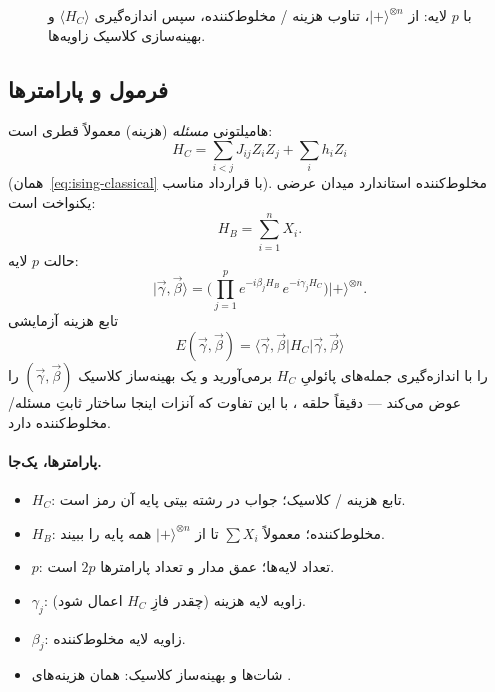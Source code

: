 \begin{figure}[htbp]
	\centering
	\begin{latin}
		\resizebox{\ifdim\width>\textwidth\textwidth\else\width\fi}{!}{%
		}
	\end{latin}
	\caption{ با $p$ لایه: از $\lvert+\rangle^{\otimes n}$، تناوب هزینه / مخلوط‌کننده، سپس اندازه‌گیری $\langle H_C\rangle$ و بهینه‌سازی کلاسیک زاویه‌ها.}
	\label{fig:qaoa-layers}
\end{figure}

\subsection{فرمول و پارامترها}

هامیلتونی \emph{مسئله} (هزینه) معمولاً قطری است:
\begin{equation}
	H_C = \sum_{i<j} J_{ij} Z_i Z_j + \sum_i h_i Z_i
\end{equation}
(همان~\eqref{eq:ising-classical} با قرارداد مناسب). مخلوط‌کننده استاندارد میدان عرضی یکنواخت است:
\begin{equation}
	H_B = \sum_{i=1}^{n} X_i.
\end{equation}
حالت $p$ لایه:
\begin{equation}
	\label{eq:qaoa}
	\lvert\vec\gamma,\vec\beta\rangle
	=
	\Biggl(\prod_{j=1}^{p}
		e^{-i\beta_j H_B}\,
		e^{-i\gamma_j H_C}
	\Biggr)
	\lvert+\rangle^{\otimes n}.
\end{equation}
تابع هزینه آزمایشی
\begin{equation}
	E(\vec\gamma,\vec\beta)
	=
	\langle\vec\gamma,\vec\beta\rvert H_C \lvert\vec\gamma,\vec\beta\rangle
\end{equation}
را با اندازه‌گیری جمله‌های پائولیِ $H_C$ برمی‌آورید و یک بهینه‌ساز کلاسیک $(\vec\gamma,\vec\beta)$ را عوض می‌کند --- دقیقاً حلقه ، با این تفاوت که آنزات اینجا ساختار ثابتِ مسئله/مخلوط‌کننده دارد.

\paragraph{پارامترها، یک‌جا.}
\begin{itemize}
	\item $H_C$: تابع هزینه /  کلاسیک؛ جواب در رشته بیتی پایه آن رمز است.
	\item $H_B$: مخلوط‌کننده؛ معمولاً $\sum X_i$ تا از $\lvert+\rangle^{\otimes n}$ همه پایه را ببیند.
	\item $p$: تعداد لایه‌ها؛ عمق مدار و تعداد پارامترها $2p$ است.
	\item $\gamma_j$: زاویه لایه هزینه (چقدر فازِ $H_C$ اعمال شود).
	\item $\beta_j$: زاویه لایه مخلوط‌کننده.
	\item شات‌ها و بهینه‌ساز کلاسیک: همان هزینه‌های .
\end{itemize}

